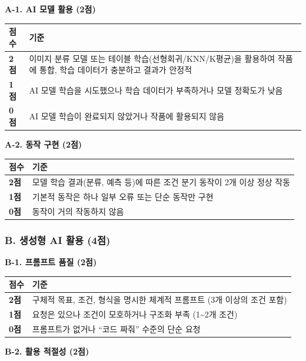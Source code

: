 \documentclass[a4paper,11pt]{ltjsarticle}
\begin{document}
\textbf{A-1. AI 모델 활용 (2점)}

\noindent
\begin{tabularx}{\textwidth}{|>{\centering\arraybackslash}p{1cm}|X|}
\hline
\textbf{점수} & \textbf{기준} \\ \hline
\textbf{2점} & 이미지 분류 모델 또는 테이블 학습(선형회귀/KNN/K평균)을 활용하여 작품에 통합, 학습 데이터가 충분하고 결과가 안정적 \\ \hline
\textbf{1점} & AI 모델 학습을 시도했으나 학습 데이터가 부족하거나 모델 정확도가 낮음 \\ \hline
\textbf{0점} & AI 모델 학습이 완료되지 않았거나 작품에 활용되지 않음 \\ \hline
\end{tabularx}

\vspace{0.3em}
\textbf{A-2. 동작 구현 (2점)}

\noindent
\begin{tabularx}{\textwidth}{|>{\centering\arraybackslash}p{1cm}|X|}
\hline
\textbf{점수} & \textbf{기준} \\ \hline
\textbf{2점} & 모델 학습 결과(분류, 예측 등)에 따른 조건 분기 동작이 2개 이상 정상 작동 \\ \hline
\textbf{1점} & 기본적 동작은 하나 일부 오류 또는 단순 동작만 구현 \\ \hline
\textbf{0점} & 동작이 거의 작동하지 않음 \\ \hline
\end{tabularx}

\subsubsection{B. 생성형 AI 활용 (4점)}

\textbf{B-1. 프롬프트 품질 (2점)}

\noindent
\begin{tabularx}{\textwidth}{|>{\centering\arraybackslash}p{1cm}|X|}
\hline
\textbf{점수} & \textbf{기준} \\ \hline
\textbf{2점} & 구체적 목표, 조건, 형식을 명시한 체계적 프롬프트 (3개 이상의 조건 포함) \\ \hline
\textbf{1점} & 요청은 있으나 조건이 모호하거나 구조화 부족 (1\textasciitilde{}2개 조건) \\ \hline
\textbf{0점} & 프롬프트가 없거나 ``코드 짜줘'' 수준의 단순 요청 \\ \hline
\end{tabularx}

\vspace{0.3em}
\textbf{B-2. 활용 적절성 (2점)}
\end{document}
